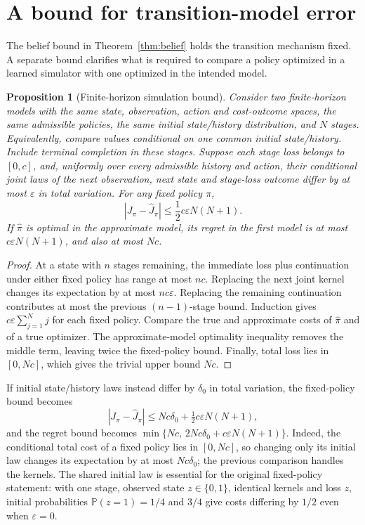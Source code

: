 \documentclass[11pt]{article}
\numberwithin{equation}{section}
\newtheorem{proposition}[theorem]{Proposition}
\theoremstyle{definition}
\theoremstyle{remark}
\theoremstyle{definition}
\newcommand{\Pp}{\mathbb P}
\begin{document}
\section{A bound for transition-model error}\label{app:modelerror}

The belief bound in Theorem~\ref{thm:belief} holds the transition mechanism
fixed. A separate bound clarifies what is required to compare a policy
optimized in a learned simulator with one optimized in the intended model.

\begin{proposition}[Finite-horizon simulation bound]\label{prop:simulation}
Consider two finite-horizon models with the same state, observation, action
and cost-outcome spaces, the same admissible policies, the same initial
state/history distribution, and $N$ stages. Equivalently, compare values
conditional on one common initial state/history.
Include terminal completion in these stages. Suppose each stage loss belongs
to $[0,c]$, and, uniformly over every admissible history and action, their
conditional joint laws of the next observation, next state and stage-loss
outcome differ by at most $\varepsilon$ in total variation. For any fixed
policy $\pi$,
\begin{equation}
 |J_\pi-\widehat J_\pi|\leq
          \frac12c\varepsilon N(N+1).
\end{equation}
If $\widehat\pi$ is optimal in the approximate model, its regret in the
first model is at most $c\varepsilon N(N+1)$, and also at most $Nc$.
\end{proposition}
\begin{proof}
At a state with $n$ stages remaining, the immediate loss plus continuation
under either fixed policy has range at most $nc$. Replacing the next joint
kernel changes its expectation by at most $nc\varepsilon$. Replacing the
remaining continuation contributes at most the previous $(n-1)$-stage bound.
Induction gives $c\varepsilon\sum_{j=1}^Nj$ for each fixed policy.
Compare the true and approximate costs of $\widehat\pi$ and of a true
optimizer. The approximate-model optimality inequality removes the middle
term, leaving twice the fixed-policy bound. Finally, total loss lies in
$[0,Nc]$, which gives the trivial upper bound $Nc$.
\end{proof}

If initial state/history laws instead differ by $\delta_0$ in total variation,
the fixed-policy bound becomes
\[
 |J_\pi-\widehat J_\pi|\leq
 Nc\delta_0+\tfrac12c\varepsilon N(N+1),
\]
and the regret bound becomes
$\min\{Nc,\,2Nc\delta_0+c\varepsilon N(N+1)\}$.
Indeed, the conditional total cost of a fixed policy lies in $[0,Nc]$, so
changing only its initial law changes its expectation by at most $Nc\delta_0$;
the previous comparison handles the kernels. The shared initial law is
essential for the original fixed-policy statement: with one stage, observed
state $z\in\{0,1\}$, identical kernels and loss $z$, initial probabilities
$\Pp(z=1)=1/4$ and $3/4$ give costs differing by $1/2$ even when
$\varepsilon=0$.
\end{document}
